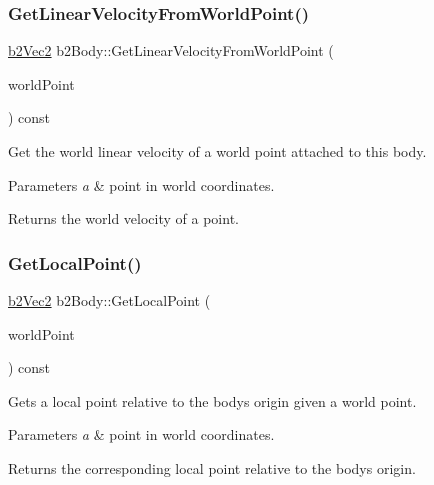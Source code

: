 \subsubsection{\texorpdfstring{Get\+Linear\+Velocity\+From\+World\+Point()}{GetLinearVelocityFromWorldPoint()}\hspace{0.1cm}{\footnotesize\ttfamily [2/2]}}
{\footnotesize\ttfamily \hyperlink{structb2Vec2}{b2\+Vec2} b2\+Body\+::\+Get\+Linear\+Velocity\+From\+World\+Point (\begin{DoxyParamCaption}\item[{const \hyperlink{structb2Vec2}{b2\+Vec2} \&}]{world\+Point }\end{DoxyParamCaption}) const}

Get the world linear velocity of a world point attached to this body. 
\begin{DoxyParams}{Parameters}
{\em a} & point in world coordinates. \\
\hline
\end{DoxyParams}
\begin{DoxyReturn}{Returns}
the world velocity of a point. 
\end{DoxyReturn}
\mbox{\label{classb2Body_a0df8f4312ab23223489323326b2d763d}} 
\subsubsection{\texorpdfstring{Get\+Local\+Point()}{GetLocalPoint()}\hspace{0.1cm}{\footnotesize\ttfamily [1/2]}}
{\footnotesize\ttfamily \hyperlink{structb2Vec2}{b2\+Vec2} b2\+Body\+::\+Get\+Local\+Point (\begin{DoxyParamCaption}\item[{const \hyperlink{structb2Vec2}{b2\+Vec2} \&}]{world\+Point }\end{DoxyParamCaption}) const\hspace{0.3cm}{\ttfamily [inline]}}

Gets a local point relative to the body\textquotesingle{}s origin given a world point. 
\begin{DoxyParams}{Parameters}
{\em a} & point in world coordinates. \\
\hline
\end{DoxyParams}
\begin{DoxyReturn}{Returns}
the corresponding local point relative to the body\textquotesingle{}s origin. 
\end{DoxyReturn}
\mbox{\label{classb2Body_a0df8f4312ab23223489323326b2d763d}} 
